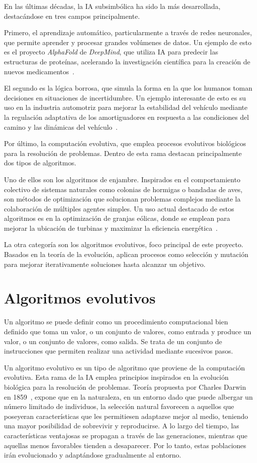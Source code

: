 En las últimas décadas, la IA subsimbólica ha sido la más desarrollada, destacándose en tres campos principalmente.

Primero, el aprendizaje automático, particularmente a través de redes neuronales, que permite aprender y procesar grandes volúmenes de datos. Un ejemplo de esto es el proyecto \textit{AlphaFold} de \textit{DeepMind}, que utiliza IA para predecir las estructuras de proteínas, acelerando la investigación científica para la creación de nuevos medicamentos~\cite{alphafold2024}.

El segundo es la lógica borrosa, que simula la forma en la que los humanos toman decisiones en situaciones de incertidumbre. Un ejemplo interesante de esto es su uso en la industria automotriz para mejorar la estabilidad del vehículo mediante la regulación adaptativa de los amortiguadores en respuesta a las condiciones del camino y las dinámicas del vehículo~\cite{ivanov2015}.

Por último, la computación evolutiva, que emplea procesos evolutivos biológicos para la resolución de problemas. Dentro de esta rama destacan principalmente dos tipos de algoritmos.

Uno de ellos son los algoritmos de enjambre. Inspirados en el comportamiento colectivo de sistemas naturales como colonias de hormigas o bandadas de aves, son métodos de optimización que solucionan problemas complejos mediante la colaboración de múltiples agentes simples. Un uso actual destacado de estos algoritmos es en la optimización de granjas eólicas, donde se emplean para mejorar la ubicación de turbinas y maximizar la eficiencia energética~\cite{dong2023}.

La otra categoría son los algoritmos evolutivos, foco principal de este proyecto. Basados en la teoría de la evolución, aplican procesos como selección y mutación para mejorar iterativamente soluciones hasta alcanzar un objetivo.

\section{Algoritmos evolutivos}

Un algoritmo se puede definir como un procedimiento computacional bien definido que toma un valor, o un conjunto de valores, como entrada y produce un valor, o un conjunto de valores, como salida. Se trata de un conjunto de instrucciones que permiten realizar una actividad mediante sucesivos pasos.

Un algoritmo evolutivo es un tipo de algoritmo que proviene de la computación evolutiva. Esta rama de la IA emplea principios inspirados en la evolución biológica para la resolución de problemas. Teoría propuesta por Charles Darwin en 1859~\cite{darwin1859}, expone que en la naturaleza, en un entorno dado que puede albergar un número limitado de individuos, la selección natural favorecen a aquellos que poseyeran características que les permitiesen adaptarse mejor al medio, teniendo una mayor posibilidad de sobrevivir y reproducirse. A lo largo del tiempo, las características ventajosas se propagan a través de las generaciones, mientras que aquellas menos favorables tienden a desaparecer. Por lo tanto, estas poblaciones irán evolucionado y adaptándose gradualmente al entorno.


